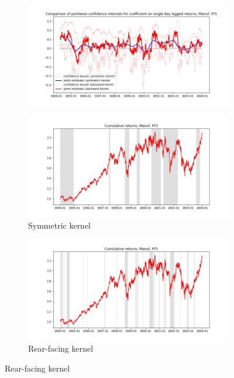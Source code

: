 \documentclass{article}
\begin{document}
\newpage

\begin{figure}

\centering

  \begin{subfigure}[b]{\textwidth}
    \includegraphics[width=\textwidth]{Manuf/pointwiseCIs_layered_FF5.jpg}
    \label{fig:1}
  \end{subfigure}
  \begin{subfigure}[b]{0.45\textwidth}
    \includegraphics[width=\textwidth]{Manuf/full_cumrets_ofint_FF5.jpg}
    \caption*{Symmetric kernel}
    \label{fig:2}
  \end{subfigure}
   \begin{subfigure}[b]{0.45\textwidth}
    \includegraphics[width=\textwidth]{Manuf/bwunif_full_cumrets_ofint_FF5.jpg}
    \caption*{Rear-facing kernel}
    \label{fig:2}
  \end{subfigure}
  
\end{figure}
\end{document}
